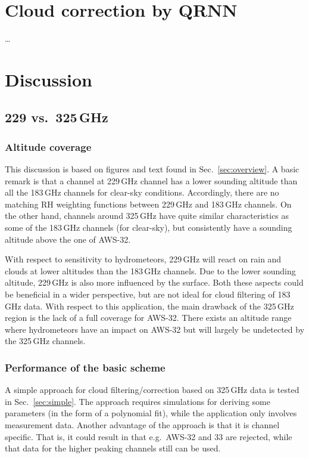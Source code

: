 \documentclass[12pt]{article}
\begin{document}
\section{Cloud correction by QRNN}
%
\dots


\section{Discussion}

\subsection{229 vs.\ 325\,GHz}


\subsubsection{Altitude coverage}
%
This discussion is based on figures and text found in Sec.~\ref{sec:overview}.
A basic remark is that a channel at 229\,GHz channel has a lower sounding
altitude than all the 183\,GHz channels for clear-sky conditions. Accordingly,
there are no matching RH weighting functions between 229\,GHz and 183\,GHz
channels. On the other hand, channels around 325\,GHz have quite similar
characteristics as some of the 183\,GHz channels (for clear-sky), but
consistently have a sounding altitude above the one of AWS-32.

With respect to sensitivity to hydrometeors, 229\,GHz will react on rain and
clouds at lower altitudes than the 183\,GHz channels. Due to the lower sounding
altitude, 229\,GHz is also more influenced by the surface. Both these aspects
could be beneficial in a wider perspective, but are not ideal for cloud
filtering of 183\,GHz data. With respect to this application, the main drawback
of the 325\,GHz region is the lack of a full coverage for AWS-32. There exists
an altitude range where hydrometeors have an impact on AWS-32 but will largely
be undetected by the 325\,GHz channels.


\subsubsection{Performance of the basic scheme}
%
A simple approach for cloud filtering/correction based on 325\,GHz data is
tested in Sec.~\ref{sec:simple}. The approach requires simulations for deriving
some parameters (in the form of a polynomial fit), while the application only
involves measurement data. Another advantage of the approach is that it is
channel specific. That is, it could result in that e.g.\ AWS-32 and 33 are
rejected, while that data for the higher peaking channels still can be used.
\end{document}
